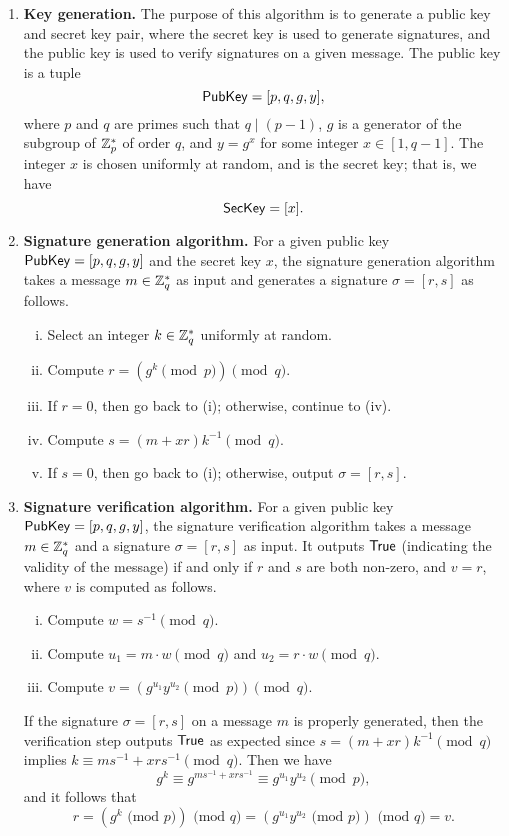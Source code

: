 \begin{enumerate}
    \item \textbf{Key generation.} The purpose of this algorithm is to generate a 
    public key and secret key pair, where the secret key is used to generate signatures, 
    and the public key is used to verify signatures on a given message. The 
    public key is a tuple 
    \[ {\sf PubKey} = [p, q, g, y], \] 
    where $p$ and $q$ are primes such that $q \mid (p-1)$, $g$ is a generator of the 
    subgroup of $\mathbb{Z}_p^*$ of order $q$, and $y = g^x$ for some integer $x \in [1, 
    q-1]$. The integer $x$ is chosen uniformly at random, and is the secret key; 
    that is, we have 
    \[ {\sf SecKey} = [x]. \] 

    \item \textbf{Signature generation algorithm.} For a given public key 
    ${\sf PubKey} = [p, q, g, y]$ and the secret key $x$, the signature generation 
    algorithm takes a message $m \in \mathbb{Z}_q^*$ as input and generates a signature 
    $\sigma = [r, s]$ as follows. 
    \begin{enumerate}[(i)]
        \item Select an integer $k \in \mathbb{Z}_q^*$ uniformly at random.
        \item Compute $r = (g^k \pmod p) \pmod q$. 
        \item If $r = 0$, then go back to (i); otherwise, continue to (iv). 
        \item Compute $s = (m + xr)k^{-1} \pmod q$. 
        \item If $s = 0$, then go back to (i); otherwise, output $\sigma = [r, s]$. 
    \end{enumerate}

    \item \textbf{Signature verification algorithm.} For a given public key 
    ${\sf PubKey} = [p, q, g, y]$, the signature verification algorithm takes a 
    message $m \in \mathbb{Z}_q^*$ and a signature $\sigma = [r, s]$ as input.
    It outputs ${\sf True}$ (indicating the validity of the message) if and only if 
    $r$ and $s$ are both non-zero, and $v = r$, where $v$ is computed as follows. 
    \begin{enumerate}[(i)]
        \item Compute $w = s^{-1} \pmod q$. 
        \item Compute $u_1 = m \cdot w \pmod q$ and $u_2 = r \cdot w \pmod q$. 
        \item Compute $v = (g^{u_1} y^{u_2} \pmod p) \pmod q$. 
    \end{enumerate}
    If the signature $\sigma = [r, s]$ on a message $m$ is properly generated, 
    then the verification step outputs ${\sf True}$ as expected since 
    $s = (m + xr)k^{-1} \pmod q$ implies $k \equiv ms^{-1} + xrs^{-1} \pmod q$. 
    Then we have 
    \[ g^k \equiv g^{ms^{-1} + xrs^{-1}} \equiv g^{u_1} y^{u_2} \pmod p, \] 
    and it follows that 
    \[ r = (g^k \text{ (mod $p$)}) \text{ (mod $q$)} = (g^{u_1} y^{u_2} 
    \text{ (mod $p$)}) \text{ (mod $q$)} = v. \]  
\end{enumerate}

